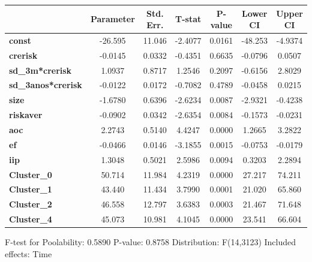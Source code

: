 \begin{center}
\begin{tabular}{lclc}
\end{tabular}
\begin{tabular}{lcccccc}
                           & \textbf{Parameter} & \textbf{Std. Err.} & \textbf{T-stat} & \textbf{P-value} & \textbf{Lower CI} & \textbf{Upper CI}  \\
\midrule
\textbf{const}             &      -26.595       &       11.046       &     -2.4077     &      0.0161      &      -48.253      &      -4.9374       \\
\textbf{crerisk}           &      -0.0145       &       0.0332       &     -0.4351     &      0.6635      &      -0.0796      &       0.0507       \\
\textbf{sd\_3m*crerisk}    &       1.0937       &       0.8717       &      1.2546     &      0.2097      &      -0.6156      &       2.8029       \\
\textbf{sd\_3anos*crerisk} &      -0.0122       &       0.0172       &     -0.7082     &      0.4789      &      -0.0458      &       0.0215       \\
\textbf{size}              &      -1.6780       &       0.6396       &     -2.6234     &      0.0087      &      -2.9321      &      -0.4238       \\
\textbf{riskaver}          &      -0.0902       &       0.0342       &     -2.6354     &      0.0084      &      -0.1573      &      -0.0231       \\
\textbf{aoc}               &       2.2743       &       0.5140       &      4.4247     &      0.0000      &       1.2665      &       3.2822       \\
\textbf{ef}                &      -0.0466       &       0.0146       &     -3.1855     &      0.0015      &      -0.0753      &      -0.0179       \\
\textbf{iip}               &       1.3048       &       0.5021       &      2.5986     &      0.0094      &       0.3203      &       2.2894       \\
\textbf{Cluster\_0}        &       50.714       &       11.984       &      4.2319     &      0.0000      &       27.217      &       74.211       \\
\textbf{Cluster\_1}        &       43.440       &       11.434       &      3.7990     &      0.0001      &       21.020      &       65.860       \\
\textbf{Cluster\_2}        &       46.558       &       12.797       &      3.6383     &      0.0003      &       21.467      &       71.648       \\
\textbf{Cluster\_4}        &       45.073       &       10.981       &      4.1045     &      0.0000      &       23.541      &       66.604       \\
\bottomrule
\end{tabular}
\end{center}

F-test for Poolability: 0.5890 \newline
 P-value: 0.8758 \newline
 Distribution: F(14,3123) \newline
  \newline
 Included effects: Time